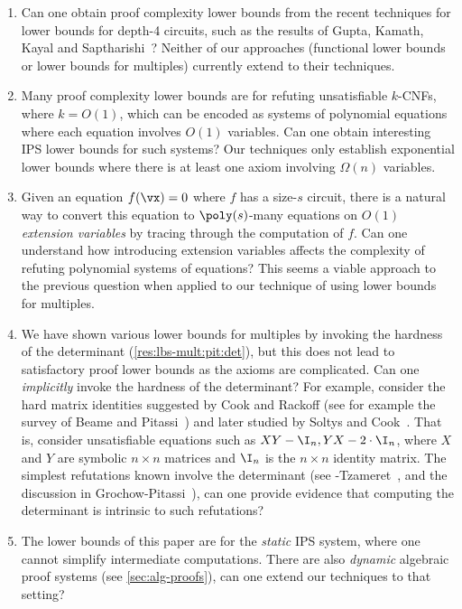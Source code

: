 \documentclass[11pt]{article}
\numberwithin{equation}{section}
\theoremstyle{definition}
\theoremstyle{plain}
\begin{document}
\begin{enumerate}
        \item Can one obtain proof complexity lower bounds from the recent techniques for lower bounds for depth-4 circuits, such as the results of Gupta, Kamath, Kayal and Saptharishi~\cite{GuptaKKS14}? Neither of our approaches (functional lower bounds or lower bounds for multiples) currently extend to their techniques.

        \item Many proof complexity lower bounds are for refuting unsatisfiable $k$-CNFs, where $k=O(1)$, which can be encoded as systems of polynomial equations where each equation involves $O(1)$ variables.  Can one obtain interesting IPS lower bounds for such systems? Our techniques only establish exponential lower bounds where there is at least one axiom involving $\Omega(n)$ variables.

        \item Given an equation $f(\vx)=0$ where $f$ has a size-$s$ circuit, there is a natural way to convert this equation to $\poly(s)$-many equations on $O(1)$ \emph{extension variables} by tracing through the computation of $f$.  Can one understand how introducing extension variables affects the complexity of refuting polynomial systems of equations? This seems a viable approach to the previous question when applied to our technique of using lower bounds for multiples.

        \item We have shown various lower bounds for multiples by invoking the hardness of the determinant (\autoref{res:lbs-mult:pit:det}), but this does not lead to satisfactory proof lower bounds as the axioms are complicated.  Can one \emph{implicitly} invoke the hardness of the determinant?  For example, consider the hard matrix identities suggested by Cook and Rackoff (see for example the survey of Beame and Pitassi~\cite{BeamePitassi98}) and later studied by Soltys and Cook~\cite{SoltysCook04}.  That is, consider unsatisfiable equations such as $XY-\I_n,YX-2\cdot \I_n$, where $X$ and $Y$ are symbolic $n\times n$ matrices and $\I_n$ is the $n\times n$ identity matrix.  The simplest refutations known involve the determinant (see \Hrubes-Tzameret~\cite{HrubesTzameret15}, and the discussion in Grochow-Pitassi~\cite{DBLP:journals/jacm/GrochowP18}), can one provide evidence that computing the determinant is intrinsic to such refutations?

        \item The lower bounds of this paper are for the \emph{static} IPS system, where one cannot simplify intermediate computations.  There are also \emph{dynamic} algebraic proof systems (see \autoref{sec:alg-proofs}), can one extend our techniques to that setting?
\end{enumerate}
\end{document}
